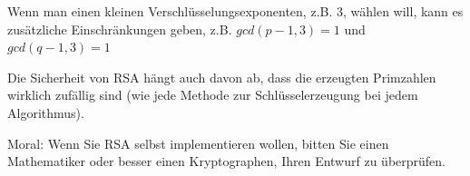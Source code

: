 \documentclass[a4paper]{article}
\begin{document}
\begin{multicols}{3}
\begin{itemize*}
\begin{itemize*}
\begin{itemize*}
                        \item Wenn man einen kleinen Verschlüsselungsexponenten, z.B. 3, wählen will, kann es zusätzliche Einschränkungen geben, z.B. $gcd(p-1, 3) = 1$ und $gcd(q-1,3)=1$
                  \end{itemize*}
                  \item Die Sicherheit von RSA hängt auch davon ab, dass die erzeugten Primzahlen wirklich zufällig sind (wie jede Methode zur Schlüsselerzeugung bei jedem Algorithmus).
                  \item Moral: Wenn Sie RSA selbst implementieren wollen, bitten Sie einen Mathematiker oder besser einen Kryptographen, Ihren Entwurf zu überprüfen.
            \end{itemize*}
      \end{itemize*}



\end{multicols}
\end{document}
